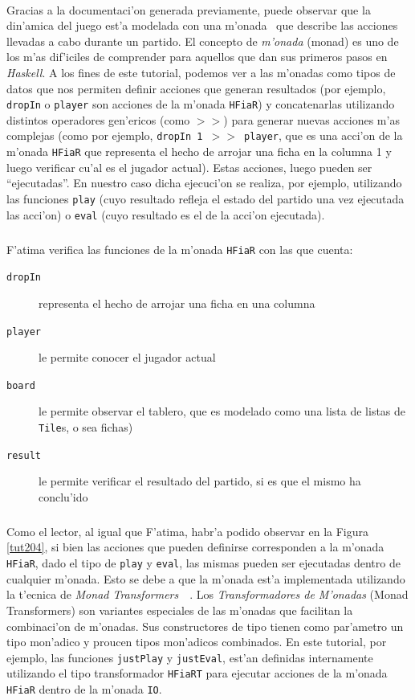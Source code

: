 \documentclass[a4paper]{article}
\newcommand{\haskell}{\textsl{Haskell}}
\begin{document}
\paragraph{}Gracias a la documentaci'on generada previamente, puede observar que la din'amica del juego est'a modelada con una m'onada~\cite{monads} que describe las acciones llevadas a cabo durante un partido.  El concepto de \textsl{m'onada} (monad) es uno de los m'as dif'iciles de comprender para aquellos que dan sus primeros pasos en \haskell.  A los fines de este tutorial, podemos ver a las m'onadas como tipos de datos que nos permiten definir acciones que generan resultados (por ejemplo, \texttt{dropIn} o \texttt{player} son acciones de la m'onada \texttt{HFiaR}) y concatenarlas utilizando distintos operadores gen'ericos (como \texttt{$>>$}) para generar nuevas acciones m'as complejas (como por ejemplo, \texttt{dropIn 1 $>>$ player}, que es una acci'on de la m'onada \texttt{HFiaR} que representa el hecho de arrojar una ficha en la columna 1 y luego verificar cu'al es el jugador actual).  Estas acciones, luego pueden ser ``ejecutadas''.  En nuestro caso dicha ejecuci'on se realiza, por ejemplo, utilizando las funciones \texttt{play} (cuyo resultado refleja el estado del partido una vez ejecutada las acci'on) o \texttt{eval} (cuyo resultado es el de la acci'on ejecutada).
\subparagraph{}F'atima verifica las funciones de la m'onada \texttt{HFiaR} con las que cuenta:
\begin{description}
	\item[\texttt{dropIn}] representa el hecho de arrojar una ficha en una columna
	\item[\texttt{player}] le permite conocer el jugador actual
	\item[\texttt{board}] le permite observar el tablero, que es modelado como una lista de listas de \texttt{Tile}s, o sea fichas)
	\item[\texttt{result}] le permite verificar el resultado del partido, si es que el mismo ha conclu'ido
\end{description}

\subparagraph{}Como el lector, al igual que F'atima, habr'a podido observar en la Figura \ref{tut204}, si bien las acciones que pueden definirse corresponden a la m'onada \texttt{HFiaR}, dado el tipo de \texttt{play} y \texttt{eval}, las mismas pueden ser ejecutadas dentro de cualquier m'onada.  Esto se debe a que la m'onada est'a implementada utilizando la t'ecnica de \textsl{Monad Transformers}~\cite{realworldhaskell}~\cite{mtl}.  Los \textsl{Transformadores de M'onadas} (Monad Transformers) son variantes especiales de las m'onadas que facilitan la combinaci'on de m'onadas.  Sus constructores de tipo tienen como par'ametro un tipo mon'adico y proucen tipos mon'adicos combinados.  En este tutorial, por ejemplo, las funciones \texttt{justPlay} y \texttt{justEval}, est'an definidas internamente utilizando el tipo transformador \texttt{HFiaRT} para ejecutar acciones de la m'onada \texttt{HFiaR} dentro de la m'onada \texttt{IO}.
\end{document}
